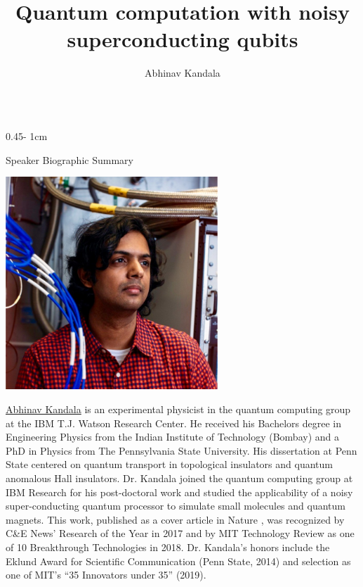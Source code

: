 \documentclass{../psuposter}
\title{Quantum computation with noisy superconducting qubits}
\author{Abhinav Kandala}
\institute{IBM T.J. Watson Research Center}
\begin{document}
\begin{frame}
\begin{columns}[t, totalwidth=\textwidth]
\begin{column}{0.45\textwidth - 1cm}


    \begin{block}{Speaker Biographic Summary}
    	\begin{center}
    		\includegraphics[width=0.6\textwidth]{images/kandala}
    	\end{center}
    	\href{https://researcher.watson.ibm.com/researcher/view.php?person=us-akandala}{Abhinav Kandala} is an experimental physicist in the quantum computing group at the IBM T.J. Watson Research Center. He received his Bachelors degree in Engineering Physics from the Indian Institute of Technology (Bombay) and a PhD in Physics from The Pennsylvania State University. His dissertation at Penn State centered on quantum transport in topological insulators and quantum anomalous Hall insulators. Dr. Kandala joined the quantum computing group at IBM Research for his post-doctoral work and  studied the applicability of a noisy super-conducting quantum processor to simulate small molecules and quantum magnets. This work, published as a cover article in Nature \cite{kandalaHardwareefficientVariationalQuantum2017}, was recognized by C\&E News’ Research of the Year in 2017 and by MIT Technology Review as one of 10 Breakthrough Technologies in 2018. Dr. Kandala’s honors include the Eklund Award for Scientific Communication (Penn State, 2014) and selection as one of MIT’s “35 Innovators under 35” (2019).
    \end{block}



\end{column}
\end{columns}
\end{frame}
\end{document}
